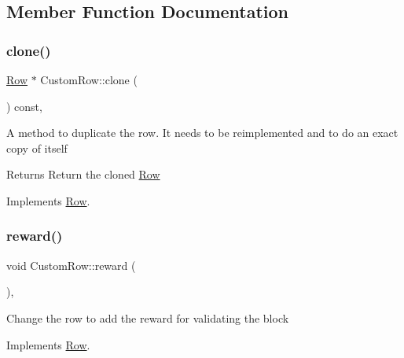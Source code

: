 \subsection{Member Function Documentation}
\mbox{\label{classCustomRow_a9d3c1b6bda5e63de382cc4a2aa29210d}} 
\subsubsection{\texorpdfstring{clone()}{clone()}}
{\footnotesize\ttfamily \mbox{\hyperlink{classRow}{Row}} $\ast$ Custom\+Row\+::clone (\begin{DoxyParamCaption}{ }\end{DoxyParamCaption}) const\hspace{0.3cm}{\ttfamily [override]}, {\ttfamily [virtual]}}

A method to duplicate the row. It needs to be reimplemented and to do an exact copy of itself

\begin{DoxyReturn}{Returns}
Return the cloned \mbox{\hyperlink{classRow}{Row}} 
\end{DoxyReturn}


Implements \mbox{\hyperlink{classRow_ae3e9c3aaa17ebc4f0e280cdec722440a}{Row}}.

\mbox{\label{classCustomRow_a007002dc965ca2727ec8db0183404bf1}} 
\subsubsection{\texorpdfstring{reward()}{reward()}}
{\footnotesize\ttfamily void Custom\+Row\+::reward (\begin{DoxyParamCaption}{ }\end{DoxyParamCaption})\hspace{0.3cm}{\ttfamily [override]}, {\ttfamily [virtual]}}

Change the row to add the reward for validating the block 

Implements \mbox{\hyperlink{classRow_a851b728fa55ecb26f8ebbc87e614581b}{Row}}.

\mbox{\label{classCustomRow_ae1e5a3b861829f8b295d3c743d6b3c7a}} 
